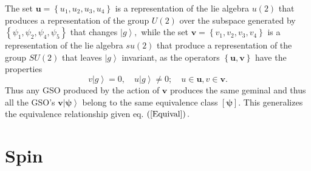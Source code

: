 \documentclass[aps,preprint]{revtex4}%
\begin{document}
The set $\boldsymbol{u}=\left\{  u_{1},u_{2},u_{3},u_{4}\right\}  $ is a
representation of the lie algebra $u\left(  2\right)  $ that produces a
representation of the group $U\left(  2\right)  $ over the subspace generated
by $\left\{  \psi_{1},\psi_{2},\psi_{4},\psi_{5}\right\}  $ that changes
$\left\vert g\right\rangle ,$ while the set $\boldsymbol{v}=\left\{
v_{1},v_{2},v_{3},v_{4}\right\}  $ is a representation of the lie algebra
$su\left(  2\right)  $ that produce a representation of the group $SU\left(
2\right)  $ that leaves $\left\vert g\right\rangle $ invariant, as the
operators $\left\{  \boldsymbol{u,v}\right\}  $ have the properties
\begin{equation}
v\left\vert g\right\rangle =0,\quad u\left\vert g\right\rangle \neq0;\quad
u\in\boldsymbol{u},v\in\boldsymbol{v.}%
\end{equation}
Thus any GSO produced by the action of $\boldsymbol{v}$ produces the same
geminal and thus all the GSO's $\boldsymbol{v}\left\vert \boldsymbol{\psi
}\right\rangle $ belong to the same equivalence class $\left[
\boldsymbol{\psi}\right]  .$ This generalizes the equivalence relationship
given eq. $\left(  \ref{Equival}\right)  .$

\section{Spin\label{Spin}}
\end{document}

